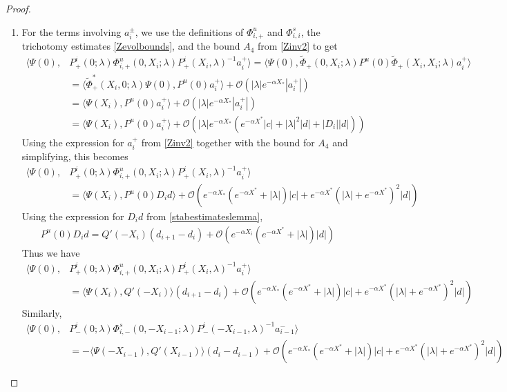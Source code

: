 \documentclass[thesis.tex]{subfiles}
\begin{document}
\begin{lemma}
\begin{proof}
\begin{enumerate}
\item For the terms involving $a_i^\pm$, we use the definitions of $\Phi^u_{i,+}$ and $\Phi^s_{i,i}$, the trichotomy estimates \cref{Zevolbounds}, and the bound $A_4$ from \cref{Zinv2} to get
\begin{align*}
\langle \Psi(0), &P^i_+(0; \lambda) \Phi^u_{i,+}(0, X_i; \lambda) P^i_+(X_i, \lambda)^{-1} a_i^+ \rangle = \langle \Psi(0), \tilde{\Phi}_+(0, X_i; \lambda) 
P^u(0) \tilde{\Phi}_+(X_i, X_i; \lambda)a_i^+ \rangle \\
&= \langle \tilde{\Phi}^*_+(X_i, 0; \lambda) \Psi(0), P^u(0) a_i^+ \rangle + \mathcal{O}(|\lambda|e^{-\alpha X_*}|a_i^+|) \\
&= \langle \Psi(X_i), P^u(0) a_i^+ \rangle + \mathcal{O}(|\lambda|e^{-\alpha X_*}|a_i^+|) \\
&= \langle \Psi(X_i), P^u(0) a_i^+ \rangle + \mathcal{O}\left(|\lambda|e^{-\alpha X_*} \left( e^{-\alpha X^*} |c| + |\lambda|^2 |d| + |D_i||d| \right) \right)
\end{align*}
Using the expression for $a_i^+$ from \cref{Zinv2} together with the bound for $A_4$ and simplifying, this becomes
\begin{align*}
\langle \Psi(0), &P^i_+(0; \lambda) \Phi^u_{i,+}(0, X_i; \lambda) P^i_+(X_i, \lambda)^{-1} a_i^+ \rangle \\
&= \langle \Psi(X_i), P^u(0) D_i d \rangle + \mathcal{O}\left(e^{-\alpha X_*} (e^{-\alpha X^*} + |\lambda|)|c| + e^{-\alpha X^*}(|\lambda| + e^{-\alpha X^*})^2 |d|  \right)
\end{align*}
Using the expression for $D_i d$ from \cref{stabestimateslemma}, 
\begin{align*} 
P^u(0) D_i d = Q'(-X_i)(d_{i+1} - d_i ) + \mathcal{O}( e^{-\alpha X_i} (e^{-\alpha X^*} + |\lambda| )|d|)
\end{align*}
Thus we have
\begin{align*}
\langle \Psi(0), &P^i_+(0; \lambda) \Phi^u_{i,+}(0, X_i; \lambda) P^i_+(X_i, \lambda)^{-1} a_i^+ \rangle \\
&= \langle \Psi(X_i), Q'(-X_i) \rangle (d_{i+1} - d_i ) + \mathcal{O}\left(e^{-\alpha X_*} (e^{-\alpha X^*} + |\lambda|)|c| + e^{-\alpha X^*}(|\lambda| + e^{-\alpha X^*})^2 |d|  \right)
\end{align*}
Similarly,
\begin{align*}
\langle \Psi(0), &P^i_-(0; \lambda) \Phi^s_{i,-}(0, -X_{i-1}; \lambda) P^i_-(-X_{i-1}, \lambda)^{-1} a_{i-1}^- \rangle \\
&= -\langle \Psi(-X_{i-1}), Q'(X_{i-1}) \rangle (d_i - d_{i-1} )
+ \mathcal{O}\left(e^{-\alpha X_*} (e^{-\alpha X^*} + |\lambda|)|c| + e^{-\alpha X^*}(|\lambda| + e^{-\alpha X^*})^2 |d|  \right)
\end{align*}


\end{enumerate}
\end{proof}
\end{lemma}
\end{document}
